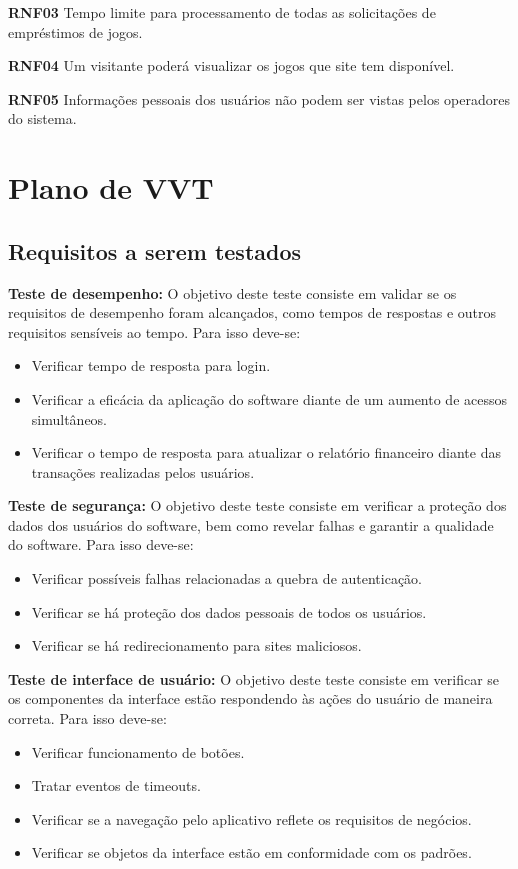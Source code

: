 \documentclass[a4paper, 12pt]{article}
\begin{document}
\textbf{RNF03} Tempo limite para processamento de todas as solicitações de empréstimos de jogos.

\textbf{RNF04} Um visitante poderá visualizar os jogos que site tem disponível.
 
\textbf{RNF05} Informações pessoais dos usuários não podem ser vistas pelos operadores do sistema.


\section{Plano de VVT}

\subsection{Requisitos a serem testados}

\textbf{Teste de desempenho:} O objetivo deste teste consiste em validar se os requisitos de desempenho foram alcançados, como tempos de respostas e outros requisitos sensíveis ao tempo. Para isso deve-se:
\begin{itemize}
    \item Verificar tempo de resposta para login.
    \item Verificar a eficácia da aplicação do software diante de um aumento de acessos simultâneos.
    \item Verificar o tempo de resposta para atualizar o relatório financeiro diante das transações realizadas pelos usuários.
\end{itemize}

\textbf{Teste de segurança:} O objetivo deste teste consiste em verificar a proteção dos dados dos usuários do software, bem como revelar falhas e garantir a qualidade do software. Para isso deve-se:
\begin{itemize}
    \item Verificar possíveis falhas relacionadas a quebra de autenticação.
    \item Verificar se há proteção dos dados pessoais de todos os usuários.
    \item Verificar se há redirecionamento para sites maliciosos.
\end{itemize}

\textbf{Teste de interface de usuário:} O objetivo deste teste consiste em verificar se os componentes da interface estão respondendo às ações do usuário de maneira correta. Para isso deve-se:
\begin{itemize}
    \item Verificar funcionamento de botões.
    \item Tratar eventos de timeouts.
    \item Verificar se a navegação pelo aplicativo reflete os requisitos de negócios.
    \item Verificar se objetos da interface estão em conformidade com os padrões.
\end{itemize}
\end{document}
